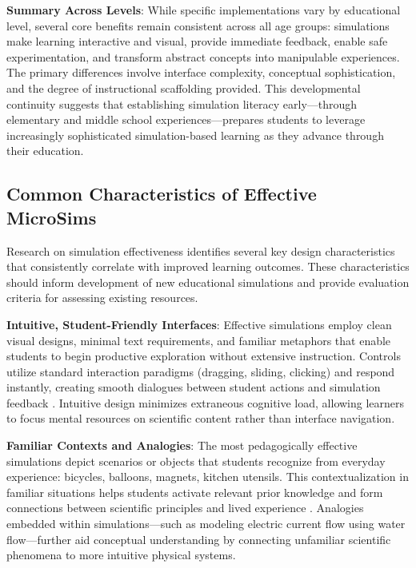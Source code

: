 \textbf{Summary Across Levels}: While specific implementations vary by educational level, several core benefits remain consistent across all age groups: simulations make learning interactive and visual, provide immediate feedback, enable safe experimentation, and transform abstract concepts into manipulable experiences. The primary differences involve interface complexity, conceptual sophistication, and the degree of instructional scaffolding provided. This developmental continuity suggests that establishing simulation literacy early---through elementary and middle school experiences---prepares students to leverage increasingly sophisticated simulation-based learning as they advance through their education.

\subsection{Common Characteristics of Effective MicroSims}

Research on simulation effectiveness identifies several key design characteristics that consistently correlate with improved learning outcomes. These characteristics should inform development of new educational simulations and provide evaluation criteria for assessing existing resources.

\textbf{Intuitive, Student-Friendly Interfaces}: Effective simulations employ clean visual designs, minimal text requirements, and familiar metaphors that enable students to begin productive exploration without extensive instruction. Controls utilize standard interaction paradigms (dragging, sliding, clicking) and respond instantly, creating smooth dialogues between student actions and simulation feedback \cite{phet2023}. Intuitive design minimizes extraneous cognitive load, allowing learners to focus mental resources on scientific content rather than interface navigation.

\textbf{Familiar Contexts and Analogies}: The most pedagogically effective simulations depict scenarios or objects that students recognize from everyday experience: bicycles, balloons, magnets, kitchen utensils. This contextualization in familiar situations helps students activate relevant prior knowledge and form connections between scientific principles and lived experience \cite{phet2023}. Analogies embedded within simulations---such as modeling electric current flow using water flow---further aid conceptual understanding by connecting unfamiliar scientific phenomena to more intuitive physical systems.

